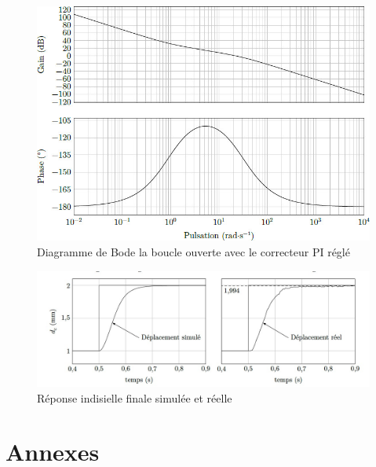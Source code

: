 \begin{figure}[!htb]
\begin{center}
\includegraphics[width=1.0\textwidth]{images/image_fig19}
\caption{Diagramme de Bode la boucle ouverte avec le correcteur PI réglé\label{fig_19}}
\end{center}
\end{figure}

\begin{figure}[!htb]
\begin{center}
\includegraphics[width=1.0\textwidth]{images/image_simu.jpg}
\caption{Réponse indisielle finale simulée et réelle \label{fig_simu}}
\end{center}
\end{figure}




\section{Annexes}


